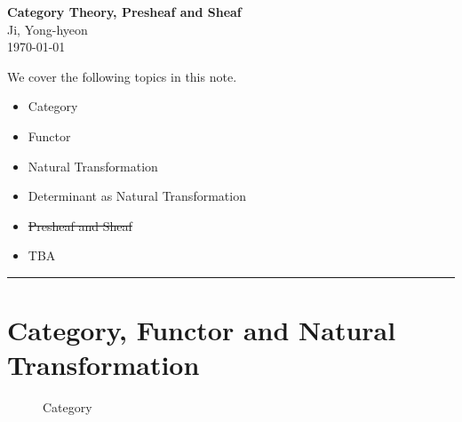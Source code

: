 \documentclass[11pt,openany]{article}
\begin{document}
\begin{center}
	\huge\textbf{Category Theory, Presheaf and Sheaf}\\
	\vspace{0.5em}
	\large{Ji, Yong-hyeon}\\
	\vspace{0.5em}
	\normalsize{\today}\\
\end{center}
We cover the following topics in this note.
\begin{itemize}
	\item Category
	\item Functor
	\item Natural Transformation
	\item Determinant as Natural Transformation
	\item \st{Presheaf and Sheaf}
	\item TBA
\end{itemize}
\hrule\vspace{12pt}
\vfill
\section{Category, Functor and Natural Transformation}
\vfill
\begin{figure}[h!]\centering
\caption{Category}
\end{figure}
\end{document}
